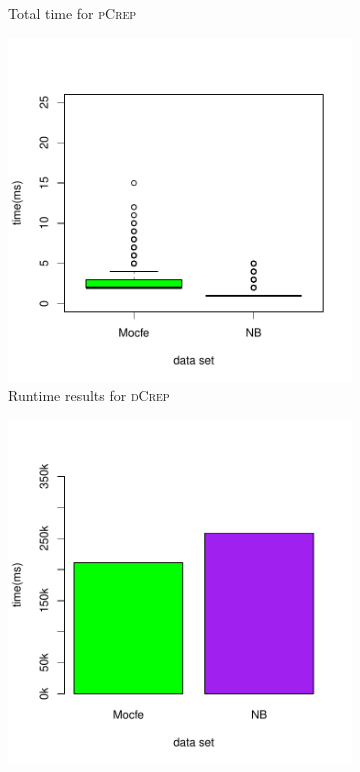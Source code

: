 \documentclass[a4paper,UKenglish,cleveref, autoref, thm-restate,authorcolumns]{../lipics/lipics-v2019}
\newcommand{\adjDel}{\textsc{pCrep}}
\newcommand{\directDecomp}{\textsc{dCrep}}
\begin{document}
\begin{figure}
\begin{minipage}{0.48\linewidth}
\begin{subfigure}[b]{\linewidth}
			\caption{Total time for \adjDel}
		\end{subfigure}		
	\end{minipage}
	\begin{minipage}{0.48\linewidth}
		\begin{subfigure}[b]{\linewidth}
			\includegraphics*[width=\linewidth]{new_time_hpc_filtered_compDecomp}
			\caption{Runtime results for \directDecomp}			
		\end{subfigure}		
	\end{minipage}
	\begin{minipage}{0.48\linewidth}
		\begin{subfigure}[b]{\linewidth}
			\includegraphics*[width=\linewidth]{new_barplot_time_hpc_filtered_compDecomp}

\end{subfigure}
\end{minipage}
\end{figure}
\end{document}
